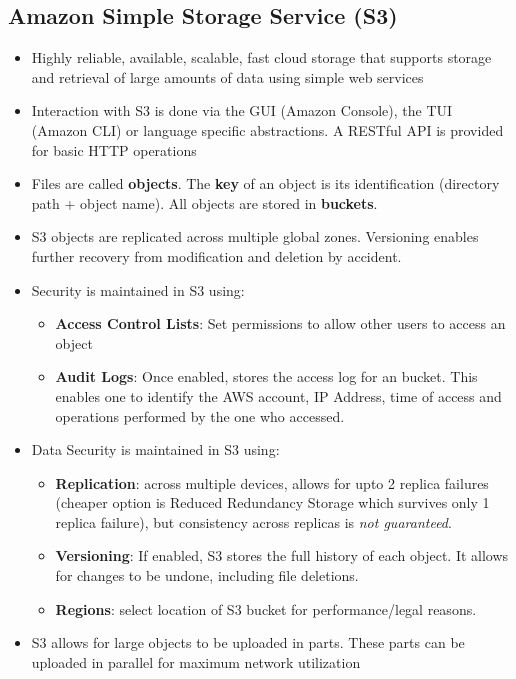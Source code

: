 \documentclass{article}
\begin{document}
\subsection{Amazon Simple Storage Service (S3)}
\begin{itemize}
    \item Highly reliable, available, scalable, fast cloud storage that supports storage and retrieval of large amounts of data using simple web services
    
    \item Interaction with S3 is done via the GUI (Amazon Console), the TUI (Amazon CLI) or language specific abstractions. A RESTful API is provided for basic HTTP operations
    
    \item Files are called \textbf{objects}. The \textbf{key} of an object is its identification (directory path + object name). All objects are stored in \textbf{buckets}.
    
    \item S3 objects are replicated across multiple global zones. Versioning enables further recovery from modification and deletion by accident.
    
    \item Security is maintained in S3 using:
    \begin{itemize}
        \item \textbf{Access Control Lists}: Set permissions to allow other users to access an object
        
        \item \textbf{Audit Logs}: Once enabled, stores the access log for an bucket. This enables one to identify the AWS account, IP Address, time of access and operations performed by the one who accessed. 
    \end{itemize}
    
    \item Data Security is maintained in S3 using:
    \begin{itemize}
        \item \textbf{Replication}: across multiple devices, allows for upto 2 replica failures (cheaper option is Reduced Redundancy Storage which survives only 1 replica failure), but consistency across replicas is \textit{not guaranteed}.
        
        \item \textbf{Versioning}: If enabled, S3 stores the full history of each object. It allows for changes to be undone, including file deletions.
        
        \item \textbf{Regions}: select location of S3 bucket for performance/legal reasons. 
    \end{itemize}
    
    \item S3 allows for large objects to be uploaded in parts. These parts can be uploaded in parallel for maximum network utilization
\end{itemize}
\end{document}
